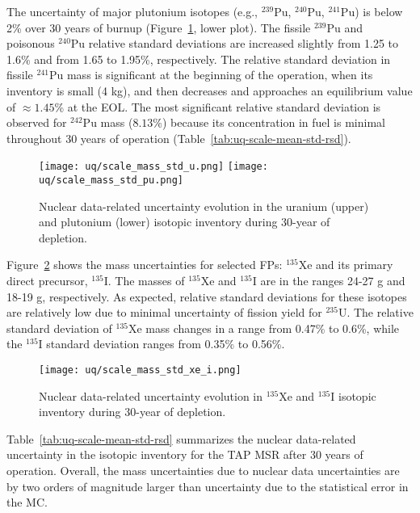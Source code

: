 The uncertainty of major plutonium isotopes (e.g., $^{239}$Pu, $^{240}$Pu, 
$^{241}$Pu) is below 2\% over 30 years of burnup 
(Figure~\ref{fig:uq-scale-u-pu}, lower plot). The fissile $^{239}$Pu and 
poisonous $^{240}$Pu relative standard deviations are increased slightly from 
1.25 to 1.6\% and from 1.65 to 1.95\%, respectively. The relative standard 
deviation in fissile $^{241}$Pu mass is significant at the beginning of the 
operation, when its inventory is small (4 kg), and then decreases and 
approaches an equilibrium value of $\approx1.45$\% at the \gls{EOL}. The 
most significant relative standard deviation is observed for $^{242}$Pu mass 
($8.13$\%) because its concentration in fuel is minimal throughout 30 years 
of operation (Table~\ref{tab:uq-scale-mean-std-rsd}).

\begin{figure}[hbp!] %
	\centering
	\texttt{[image: uq/scale\_mass\_std\_u.png]}
		\vspace{-12mm}
	\hspace{0.0mm}
	\texttt{[image: uq/scale\_mass\_std\_pu.png]}
		\vspace{+8mm}
	\caption{Nuclear data-related uncertainty evolution in the uranium (upper) 
	and plutonium (lower) isotopic inventory during 30-year of depletion.}
	\label{fig:uq-scale-u-pu}
\end{figure}

Figure~\ref{fig:uq-scale-xe-i} shows the mass uncertainties for selected 
\glspl{FP}: $^{135}$Xe and its primary direct precursor, $^{135}$I. The masses 
of $^{135}$Xe and $^{135}$I are in the ranges 24-27 g and 18-19 g, 
respectively. As expected, relative standard deviations for these isotopes are 
relatively low due to minimal uncertainty of fission yield for $^{235}$U. The 
relative standard deviation of $^{135}$Xe mass changes in a range from 
0.47\% to 0.6\%, while the $^{135}$I standard deviation ranges from 0.35\% to 
0.56\%.
\begin{figure}[hbp!] %
	\centering
	\texttt{[image: uq/scale\_mass\_std\_xe\_i.png]}
	\caption{Nuclear data-related uncertainty evolution in $^{135}$Xe and 
	$^{135}$I isotopic inventory during 30-year of depletion.}
	\label{fig:uq-scale-xe-i}
\end{figure}

Table~\ref{tab:uq-scale-mean-std-rsd} summarizes the nuclear data-related 
uncertainty in the isotopic inventory for the \gls{TAP} \gls{MSR} after 30 
years of operation. Overall, the mass uncertainties due to nuclear data 
uncertainties are by two orders of magnitude larger than uncertainty due to 
the statistical error in the \gls{MC}.  

